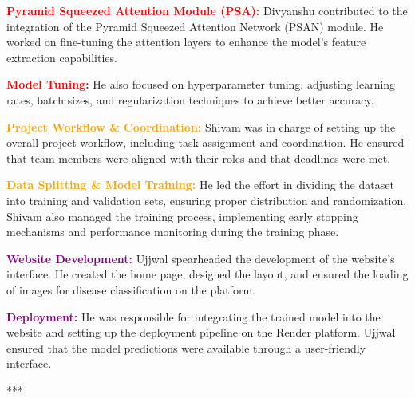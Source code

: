 \documentclass[12pt,a4paper]{article}
\begin{document}
\vspace{0.5cm}

\begin{tcolorbox}[colback=red!5!white, colframe=red!75!black, title=Divyanshu Prakash (12240540)]
    \textcolor{red}{\textbf{Pyramid Squeezed Attention Module (PSA):}} Divyanshu contributed to the integration of the Pyramid Squeezed Attention Network (PSAN) module. He worked on fine-tuning the attention layers to enhance the model’s feature extraction capabilities.
    
    \vspace{0.2cm}
    
    \textcolor{red}{\textbf{Model Tuning:}} He also focused on hyperparameter tuning, adjusting learning rates, batch sizes, and regularization techniques to achieve better accuracy.
\end{tcolorbox}

\vspace{0.5cm}

\begin{tcolorbox}[colback=orange!5!white, colframe=orange!75!black, title=Shivam (12241710)]
    \textcolor{orange}{\textbf{Project Workflow \& Coordination:}} Shivam was in charge of setting up the overall project workflow, including task assignment and coordination. He ensured that team members were aligned with their roles and that deadlines were met.
    
    \vspace{0.2cm}
    
    \textcolor{orange}{\textbf{Data Splitting \& Model Training:}} He led the effort in dividing the dataset into training and validation sets, ensuring proper distribution and randomization. Shivam also managed the training process, implementing early stopping mechanisms and performance monitoring during the training phase.
\end{tcolorbox}

\vspace{0.5cm}

\begin{tcolorbox}[colback=purple!5!white, colframe=purple!75!black, title=Ujjwal Raj (12241920)]
    \textcolor{purple}{\textbf{Website Development:}} Ujjwal spearheaded the development of the website’s interface. He created the home page, designed the layout, and ensured the loading of images for disease classification on the platform.
    
    \vspace{0.2cm}
    
    \textcolor{purple}{\textbf{Deployment:}} He was responsible for integrating the trained model into the website and setting up the deployment pipeline on the Render platform. Ujjwal ensured that the model predictions were available through a user-friendly interface.
\end{tcolorbox}
\begin{center}
***
\end{center}
\end{document}
